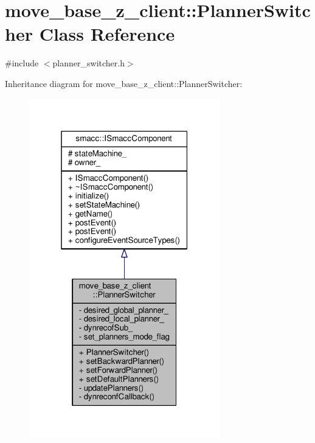 \hypertarget{classmove__base__z__client_1_1PlannerSwitcher}{}\section{move\+\_\+base\+\_\+z\+\_\+client\+:\+:Planner\+Switcher Class Reference}
\label{classmove__base__z__client_1_1PlannerSwitcher}


{\ttfamily \#include $<$planner\+\_\+switcher.\+h$>$}



Inheritance diagram for move\+\_\+base\+\_\+z\+\_\+client\+:\+:Planner\+Switcher\+:\nopagebreak
\begin{figure}[H]
\begin{center}
\leavevmode
\includegraphics[width=235pt]{classmove__base__z__client_1_1PlannerSwitcher__inherit__graph}
\end{center}
\end{figure}



